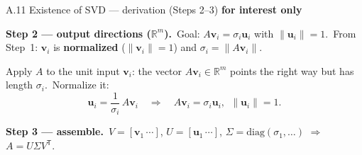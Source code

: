 \documentclass[11pt,aspectratio=169]{beamer}
\newcommand{\InterestOnly}{\textcolor{mAccent}{\textbf{for interest only}}}
\begin{document}
\begin{frame}{A.11 Existence of SVD --- derivation (Steps 2--3)}
  \footnotesize
  \InterestOnly

  \medskip
  \textbf{Step 2 --- output directions ($\mathbb{R}^m$).}\
  Goal: $A\mathbf{v}_i=\sigma_i\mathbf{u}_i$ with $\|\mathbf{u}_i\|=1$.\
  From Step~1: $\mathbf{v}_i$ is \textbf{normalized} ($\|\mathbf{v}_i\|=1$) and $\sigma_i=\|A\mathbf{v}_i\|$.

  \medskip
  Apply $A$ to the unit input $\mathbf{v}_i$: the vector $A\mathbf{v}_i\in\mathbb{R}^m$ points the right way but has length $\sigma_i$.\
  Normalize it:
  \[
    \mathbf{u}_i=\frac{1}{\sigma_i}\,A\mathbf{v}_i
    \quad\Longrightarrow\quad
    A\mathbf{v}_i=\sigma_i\mathbf{u}_i,\ \ \|\mathbf{u}_i\|=1.
  \]

  \medskip
  \textbf{Step 3 --- assemble.}\
  $V=[\mathbf{v}_1\,\cdots]$, $U=[\mathbf{u}_1\,\cdots]$, $\Sigma=\mathrm{diag}(\sigma_1,\ldots)$ $\Rightarrow$ $A=U\Sigma V^{\mathsf T}$.
\end{frame}
\end{document}
